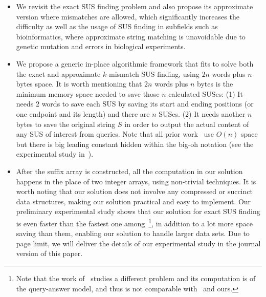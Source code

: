 \documentclass[11pt]{llncs}
\begin{document}
\begin{itemize}
\item 
We revisit the exact SUS finding problem and also
propose its approximate version where mismatches are allowed, which
significantly increases the difficulty as well as
the usage of SUS finding in subfields such as
bioinformatics, where approximate string matching is unavoidable due
to genetic mutation and errors in biological experiments.

\item 
We propose a generic in-place algorithmic framework that fits to solve
both the exact and approximate $k$-mismatch SUS finding, using $2n$
words plus $n$ bytes space. It is worth mentioning that $2n$ words
plus $n$ bytes is the minimum memory space needed to save those $n$
calculated SUSes: (1) It needs $2$ words to save each SUS by saving
its start and ending positions (or one endpoint and its length) and
there are $n$ SUSes. (2) It needs another $n$ bytes to save the
original string $S$ in order to output the actual content of any SUS
of interest from queries. Note that all prior
work~\cite{PWY-ICDE2013,TIBT2014,IKX-tcs2015,HPT-spire2014} use $O(n)$
space but there is big leading constant hidden within the big-oh
notation (see the experimental study in~\cite{IKX-tcs2015}).

\item After the suffix array is constructed, all the computation in
  our solution happens in the place of two integer arrays, 
 using non-trivial techniques. It is worth noting that our solution
 does not 
  involve any compressed or succinct data structures, making our solution
  practical and easy to implement.  Our preliminary experimental study
  shows that our solution for exact SUS finding is even faster than
  the fastest one
  among~\cite{PWY-ICDE2013,TIBT2014,IKX-tcs2015}\footnote{Note
    that the work of~\cite{HPT-spire2014} studies a different problem and its
    computation is of the query-answer model, and thus is not
    comparable with~\cite{PWY-ICDE2013,TIBT2014,IKX-tcs2015} and
    ours.}, in addition to a lot more space saving than them, enabling
  our solution to handle larger data sets.  Due to page limit, we will
  deliver the details of our experimental study in the journal version
  of this paper.
\end{itemize}
\end{document}
